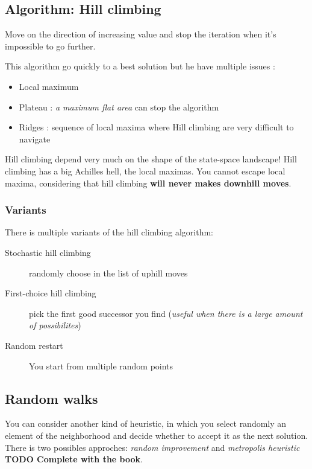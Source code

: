 \subsection{Algorithm: Hill climbing}

Move on  the direction of increasing  value and stop the  iteration when
it's impossible to go further.

This algorithm go quickly to a best solution but he have multiple issues :
\begin{itemize}
    \item Local maximum 
    \item Plateau : \textit{a maximum flat area} can stop the algorithm
    \item Ridges : sequence of local maxima where Hill climbing are very difficult to navigate
\end{itemize}


Hill climbing depend  very  much on  the  shape  of  the state-space  landscape!  Hill
climbing has a  big Achilles hell, the local maximas.  You cannot escape
local maxima,  considering that  hill climbing \textbf{will  never makes
downhill moves}.

\subsubsection{Variants}

There is multiple variants of the hill climbing algorithm:
\begin{description}
    \item[Stochastic hill climbing] randomly choose in the list of uphill moves
    \item[First-choice hill climbing] pick the first good successor you find 
        (\textit{useful when there is a large amount of possibilites})
    \item[Random restart] You start from multiple random points
\end{description}


\subsection{Random walks}

You can consider another kind of heuristic, in which you select randomly
an  element of  the  neighborhood and  decide whether  to  accept it  as
the  next solution.  There  is two  possibles approches:  \textit{random
improvement}  and  \textit{metropolis heuristic}  \textbf{TODO  Complete
with the book}.


